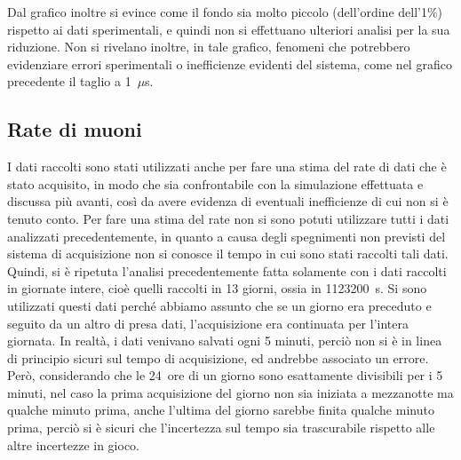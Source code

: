 Dal grafico inoltre si evince come il fondo sia molto piccolo (dell'ordine dell'1\%) rispetto ai dati sperimentali, e quindi non si effettuano ulteriori analisi per la sua riduzione. Non si rivelano inoltre, in tale grafico, fenomeni che potrebbero evidenziare errori sperimentali o inefficienze evidenti del sistema, come nel grafico precedente il taglio a 1~$\mu$s.

\subsection{Rate di muoni}
I dati raccolti sono stati utilizzati anche per fare una stima del rate di dati che è stato acquisito, in modo che sia confrontabile con la simulazione effettuata e discussa più avanti, così da avere evidenza di eventuali inefficienze di cui non si è tenuto conto. Per fare una stima del rate non si sono potuti utilizzare tutti i dati analizzati precedentemente, in quanto a causa degli spegnimenti non previsti del sistema di acquisizione non si conosce il tempo in cui sono stati raccolti tali dati.\\

Quindi, si è ripetuta l'analisi precedentemente fatta solamente con i dati raccolti in giornate intere, cioè quelli raccolti in 13 giorni, ossia in 1123200~s. Si sono utilizzati questi dati perch\'e abbiamo assunto che se un giorno era preceduto e seguito da un altro di presa dati, l'acquisizione era continuata per l'intera giornata. In realtà, i dati venivano salvati ogni 5 minuti, perciò non si è in linea di principio sicuri sul tempo di acquisizione, ed andrebbe associato un errore. Però, considerando che le 24~ore di un giorno sono esattamente divisibili per i 5 minuti, nel caso la prima acquisizione del giorno non sia iniziata a mezzanotte ma qualche minuto prima, anche l'ultima del giorno sarebbe finita qualche minuto prima, perciò si è sicuri che l'incertezza sul tempo sia trascurabile rispetto alle altre incertezze in gioco.\\


